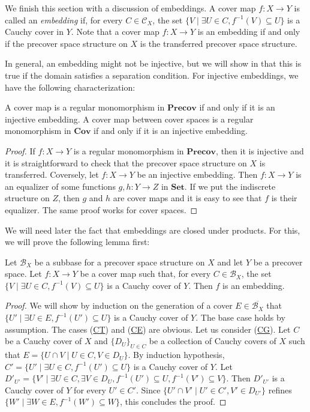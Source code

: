 \documentclass[reqno]{amsart}
\newcommand{\axref}[1]{(\hyperref[ax:#1]{#1})}
\theoremstyle{definition}
\theoremstyle{remark}
\numberwithin{figure}{section}
\newcommand{\cat}[1]{\mathbf{#1}}
\begin{document}
We finish this section with a discussion of embeddings.
A cover map $f : X \to Y$ is called an \emph{embedding} if, for every $C \in \mathcal{C}_X$,
the set $\{ V \mid \exists U \in C, f^{-1}(V) \subseteq U \}$ is a Cauchy cover in $Y$.
Note that a cover map $f : X \to Y$ is an embedding if and only if the precover space structure on $X$ is the transferred precover space structure.

In general, an embedding might not be injective, but we will show in  that this is true if the domain satisfies a separation condition.
For injective embeddings, we have the following characterization:

\begin{prop}
A cover map is a regular monomorphism in $\cat{Precov}$ if and only if it is an injective embedding.
A cover map between cover spaces is a regular monomorphism in $\cat{Cov}$ if and only if it is an injective embedding.
\end{prop}
\begin{proof}
If $f : X \to Y$ is a regular monomorphism in $\cat{Precov}$, then it is injective and it is straightforward to check that the precover space structure on $X$ is transferred.
Coversely, let $f : X \to Y$ be an injective embedding.
Then $f : X \to Y$ is an equalizer of some functions $g,h : Y \to Z$ in $\cat{Set}$.
If we put the indiscrete structure on $Z$, then $g$ and $h$ are cover maps and it is easy to see that $f$ is their equalizer.
The same proof works for cover spaces.
\end{proof}

We will need later the fact that embeddings are closed under products.
For this, we will prove the following lemma first:

\begin{lem}
Let $\mathcal{B}_X$ be a subbase for a precover space structure on $X$ and let $Y$ be a precover space.
Let $f : X \to Y$ be a cover map such that, for every $C \in \mathcal{B}_X$, the set $\{ V \mid \exists U \in C, f^{-1}(V) \subseteq U \}$ is a Cauchy cover of $Y$.
Then $f$ is an embedding.
\end{lem}
\begin{proof}
We will show by induction on the generation of a cover $E \in \overline{\mathcal{B}_X}$ that $\{ U' \mid \exists U \in E, f^{-1}(U') \subseteq U \}$ is a Cauchy cover of $Y$.
The base case holds by assumption.
The cases \axref{CT} and \axref{CE} are obvious.
Let us consider \axref{CG}.
Let $C$ be a Cauchy cover of $X$ and $\{ D_U \}_{U \in C}$ be a collection of Cauchy covers of $X$ such that $E = \{ U \cap V \mid U \in C, V \in D_U \}$.
By induction hypothesis, $C' = \{ U' \mid \exists U \in C, f^{-1}(U') \subseteq U \}$ is a Cauchy cover of $Y$.
Let $D'_{U'} = \{ V' \mid \exists U \in C, \exists V \in D_U, f^{-1}(U') \subseteq U, f^{-1}(V') \subseteq V \}$.
Then $D'_{U'}$ is a Cauchy cover of $Y$ for every $U' \in C'$.
Since $\{ U' \cap V' \mid U' \in C', V' \in D_{U'} \}$ refines $\{ W' \mid \exists W \in E, f^{-1}(W') \subseteq W \}$, this concludes the proof.
\end{proof}
\end{document}
